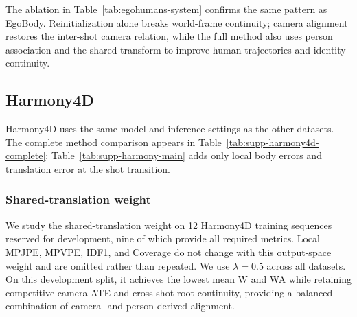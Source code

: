 The ablation in Table~\ref{tab:egohumans-system} confirms the same pattern as
EgoBody. Reinitialization alone breaks world-frame continuity; camera
alignment restores the inter-shot camera relation, while the full method also
uses person association and the shared transform to improve human trajectories
and identity continuity.

\begin{table}[t]
  \centering
  \caption{Effects of alignment, state reinitialization, and association on
  EgoHumans. W/WA/MPJPE are in mm and cross-shot root error is in m.}
  \label{tab:egohumans-system}
  \small
  \resizebox{0.95\textwidth}{!}{}
\end{table}

\FloatBarrier
\subsection{Harmony4D}
\label{app:harmony-details}

Harmony4D uses the same model and inference settings as the other datasets.
The complete method comparison appears in
Table~\ref{tab:supp-harmony4d-complete}; Table~\ref{tab:supp-harmony-main}
adds only local body errors and translation error at the shot transition.

\begin{table}[t]
  \centering
  \caption{Additional diagnostics on 88 Harmony4D clips. Local body errors
  are in mm and transition-translation error is in m.}
  \label{tab:supp-harmony-main}
  \small
  \resizebox{0.62\textwidth}{!}{}
\end{table}

\subsubsection{Shared-translation weight}
\label{app:harmony-lambda-sensitivity}

We study the shared-translation weight on 12 Harmony4D training sequences
reserved for development, nine of which provide all required metrics. Local
MPJPE, MPVPE, IDF1, and Coverage do not change with this output-space weight
and are omitted rather than repeated. We use $\lambda=0.5$ across all
datasets. On this development split, it achieves the lowest mean W and WA
while retaining competitive camera ATE and cross-shot root continuity,
providing a balanced combination of camera- and person-derived alignment.

